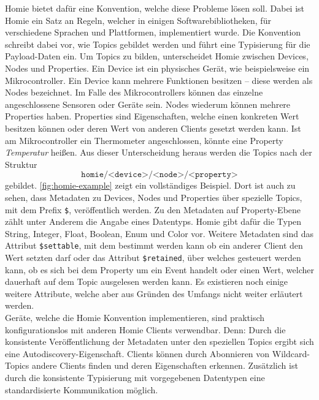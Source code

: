 Homie \cite{homie} bietet dafür eine Konvention, welche diese Probleme lösen soll. Dabei ist Homie
ein Satz an Regeln, welcher in einigen Softwarebibliotheken, für verschiedene
Sprachen und Plattformen, implementiert wurde. Die Konvention schreibt dabei vor, wie Topics 
gebildet werden und führt eine Typisierung für die Payload-Daten ein.
Um Topics zu bilden, unterscheidet Homie zwischen Devices, Nodes und Properties. Ein Device
ist ein physisches Gerät, wie beispielsweise ein Mikrocontroller.
Ein Device kann mehrere Funktionen besitzen -- diese werden als Nodes
bezeichnet. Im Falle des Mikrocontrollers können das einzelne angeschlossene Sensoren
oder Geräte sein. Nodes wiederum können mehrere Properties haben. Properties sind Eigenschaften, welche 
einen konkreten Wert besitzen können oder deren Wert von anderen Clients gesetzt werden kann.
Ist am Mikrocontroller ein Thermometer angeschlossen, könnte eine Property \emph{Temperatur} heißen.
Aus dieser Unterscheidung heraus werden die Topics nach der Struktur
\[\texttt{homie/<device>/<node>/<property>} \]
gebildet. \autoref{fig:homie-example} zeigt ein vollständiges Beispiel. Dort ist auch zu sehen, dass 
Metadaten zu Devices, Nodes und Properties über spezielle Topics, mit dem Prefix \texttt{\$},
veröffentlich werden. Zu den Metadaten auf Property-Ebene zählt unter Anderem die Angabe eines
Datentyps. Homie gibt dafür die Typen String, Integer, Float, Boolean, Enum und Color vor.
Weitere Metadaten sind das Attribut \texttt{\$settable}, mit dem bestimmt werden kann
ob ein anderer Client den Wert setzten darf oder das Attribut \texttt{\$retained}, über 
welches gesteuert werden kann, ob es sich bei dem Property um ein Event handelt oder einen Wert,
welcher dauerhaft auf dem Topic ausgelesen werden kann. Es existieren noch einige weitere Attribute,
welche aber aus Gründen des Umfangs nicht weiter erläutert werden.\\
Geräte, welche die Homie Konvention implementieren, sind praktisch konfigurationslos mit anderen
Homie Clients verwendbar. Denn: Durch die konsistente Veröffentlichung der Metadaten unter 
den speziellen Topics ergibt sich eine Autodiscovery-Eigenschaft. Clients können durch Abonnieren
von Wildcard-Topics andere Clients finden und deren Eigenschaften erkennen. Zusätzlich ist durch die
konsistente Typisierung mit vorgegebenen Datentypen eine standardisierte Kommunikation möglich. 

\iffalse
- Ein Design Prinzip ist Einfachheit (mqtt.github.io)
- MQTT ist ein sehr simples Protokoll
- Aufbau von Topics kann beliebig geschehen. MQTT gibt keine Struktur vor
- Payloads können jegliche Encodierung haben

- typisiert Daten
- Metadaten über spezielle Topics die mit \$ starten
- Autodiscovery

- Unterscheidet zwischen device node und property
- Beispiel von Webseite
\fi